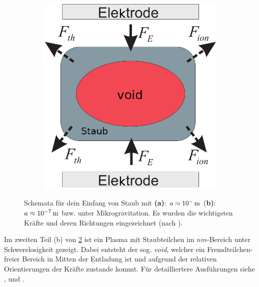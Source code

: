 \documentclass[numbers=noenddot,a4paper]{scrartcl}
\newcommand{\tenpo}[1]{ 10^{#1}}
\newcommand{\ix}[1]{_\text{#1}}
\newcommand{\tilt}[1]{\textit{#1}}
\newcommand{\fett}[1]{\textbf{#1}}
\begin{document}
\begin{figure}
\begin{subfigure}[b]{0.45\textwidth}
						\includegraphics[width=\textwidth,height=\textwidth]{figs/directionsofforcesandtrappingmelzerrechts.png}
						\caption{}
						\label{img:rechtsdirection}
					\end{subfigure}
					\caption{Schemata für dein Einfang von Staub mit \fett{(a)}: $a\approx\unit[\tenpo{-}]{m}$ (\fett{b)}: $a\approx\unit[\tenpo{-7}]{m}$ bzw. unter Mikrogravitation. Es wurden die wichtigsten Kräfte und deren Richtungen eingezeichnet (nach \cite{Melzer12}).}
					\label{img:kräfterichtungen}
				\end{figure}

			Im zweiten Teil (b) von \ref{img:kräfterichtungen} ist ein Plasma mit Staubteilchen im $\unit{nm}$-Bereich unter Schwerelosigkeit gezeigt. Dabei entsteht der sog. \tilt{void}, welcher ein Fremdteilchen-freier Bereich in Mitten der Entladung ist und aufgrund der relativen Orientierungen der Kräfte zustande kommt. Für detailliertere Ausführungen siehe \cite{Dorier95}, \cite{Morfill99} und \cite{Goree99a}.

\end{document}
